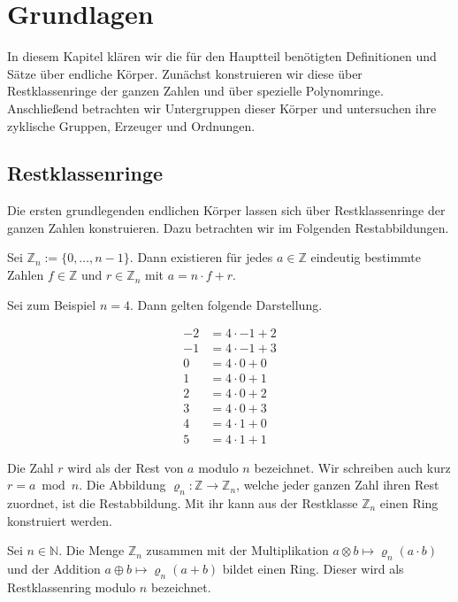 \section{Grundlagen}

In diesem Kapitel klären wir die für den Hauptteil benötigten Definitionen und Sätze über endliche Körper. Zunächst konstruieren wir diese über Restklassenringe der ganzen Zahlen und über spezielle Polynomringe. Anschließend betrachten wir Untergruppen dieser Körper und untersuchen ihre zyklische Gruppen, Erzeuger und Ordnungen.

\subsection{Restklassenringe}

Die ersten grundlegenden endlichen Körper lassen sich über Restklassenringe der ganzen Zahlen konstruieren. Dazu betrachten wir im Folgenden Restabbildungen.

\begin{satz}
    Sei $\mathbb{Z}_n := \{0,\dots,n-1\}$. Dann existieren für jedes $a \in \mathbb{Z}$ eindeutig bestimmte Zahlen $f \in \mathbb{Z}$ und $r \in \mathbb{Z}_n$ mit $a = n \cdot f + r$.
\end{satz}

Sei zum Beispiel $n = 4$. Dann gelten folgende Darstellung.

\begin{align*}
    -2 &= 4 \cdot -1 + 2 \\
    -1 &= 4 \cdot -1 + 3 \\
    0 &= 4 \cdot 0 + 0 \\
    1 &= 4 \cdot 0 + 1 \\
    2 &= 4 \cdot 0 + 2 \\
    3 &= 4 \cdot 0 + 3 \\
    4 &= 4 \cdot 1 + 0 \\
    5 &= 4 \cdot 1 + 1
\end{align*}

Die Zahl $r$ wird als der Rest von $a$ modulo $n$ bezeichnet. Wir schreiben auch kurz $r = a \bmod n$. Die Abbildung $\varrho_n : \mathbb{Z} \rightarrow \mathbb{Z}_n$, welche jeder ganzen Zahl ihren Rest zuordnet, ist die Restabbildung. Mit ihr kann aus der Restklasse $\mathbb{Z}_n$ einen Ring konstruiert werden.

\begin{satz}
    Sei $n \in \mathbb{N}$. Die Menge $\mathbb{Z}_n$ zusammen mit der Multiplikation $a \otimes b \mapsto \varrho_n(a \cdot b)$ und der Addition $a \oplus b \mapsto \varrho_n(a + b)$ bildet einen Ring. Dieser wird als Restklassenring modulo $n$ bezeichnet.
\end{satz}

